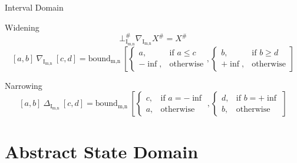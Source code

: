 \documentclass{beamer}
\newcommand{\Intmn}{\textrm{I}_{\textrm{m,n}}}
\newcommand{\bound}{\textrm{bound}_{\textrm{m,n}}}
\begin{document}
\begin{frame}{Interval Domain}
\begin{overprint}
        \begin{block}{Widening}
            $$
                \bot^\#_{\Intmn} \nabla_{\Intmn} X^\# = X^\#
            $$
            $$
                [a,b]\ \nabla_{\Intmn}\ [c,d] = \bound\ \left[
                    \begin{cases}
                        a,     & \mbox{if } a \leq c \\
                        -\inf, & \mbox{otherwise}
                    \end{cases},
                    \begin{cases}
                        b,     & \mbox{if } b \geq d \\
                        +\inf, & \mbox{otherwise}
                    \end{cases}
                    \right]
            $$
        \end{block}
        \begin{block}{Narrowing}
            $$
                [a,b]\ \Delta_{\Intmn}\ [c,d] = \bound\ \left[
                    \begin{cases}
                        c, & \mbox{if } a = -\inf \\
                        a, & \mbox{otherwise}
                    \end{cases},
                    \begin{cases}
                        d, & \mbox{if } b = +\inf \\
                        b, & \mbox{otherwise}
                    \end{cases}
                    \right]
            $$
        \end{block}
    \end{overprint}

\end{frame}

\section{Abstract State Domain}
\end{document}

